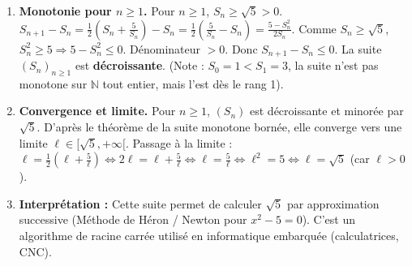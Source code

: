 \documentclass[11pt]{article}
\begin{document}
\begin{exoresolu}
\begin{enumerate}
        Par récurrence, $\forall n \ge 1, S_n \ge \sqrt{5}$.
        \item \textbf{Monotonie pour $n \ge 1$.}
        Pour $n \ge 1$, $S_n \ge \sqrt{5} > 0$.
        $S_{n+1} - S_n = \frac{1}{2}(S_n + \frac{5}{S_n}) - S_n = \frac{1}{2}(\frac{5}{S_n} - S_n) = \frac{5 - S_n^2}{2S_n}$.
        Comme $S_n \ge \sqrt{5}$, $S_n^2 \ge 5 \Rightarrow 5 - S_n^2 \le 0$. Dénominateur $>0$.
        Donc $S_{n+1} - S_n \le 0$. La suite $(S_n)_{n \ge 1}$ est \textbf{décroissante}.
        (Note : $S_0=1 < S_1=3$, la suite n'est pas monotone sur $\mathbb{N}$ tout entier, mais l'est dès le rang 1).
        \item \textbf{Convergence et limite.}
        Pour $n \ge 1$, $(S_n)$ est décroissante et minorée par $\sqrt{5}$.
        D'après le théorème de la suite monotone bornée, elle converge vers une limite $\ell \in [\sqrt{5}, +\infty[$.
        Passage à la limite : $\ell = \frac{1}{2}(\ell + \frac{5}{\ell}) \iff 2\ell = \ell + \frac{5}{\ell} \iff \ell = \frac{5}{\ell} \iff \ell^2 = 5 \iff \ell = \sqrt{5}$ (car $\ell > 0$).
        \item \textbf{Interprétation :} Cette suite permet de calculer $\sqrt{5}$ par approximation successive (Méthode de Héron / Newton pour $x^2-5=0$). C'est un algorithme de racine carrée utilisé en informatique embarquée (calculatrices, CNC).
    \end{enumerate}
\end{exoresolu}
\end{document}
